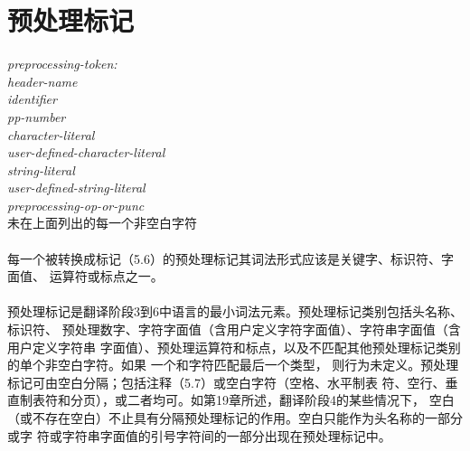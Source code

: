\section{预处理标记}
\noindent \mbox{\qquad \textit{preprocessing-token:}}                         \\
\mbox{\qquad \qquad \textit{header-name}}                                     \\
\mbox{\qquad \qquad \textit{identifier}}                                      \\
\mbox{\qquad \qquad \textit{pp-number}}                                       \\
\mbox{\qquad \qquad \textit{character-literal}}                               \\
\mbox{\qquad \qquad \textit{user-defined-character-literal}}                  \\
\mbox{\qquad \qquad \textit{string-literal}}                                  \\
\mbox{\qquad \qquad \textit{user-defined-string-literal}}                     \\
\mbox{\qquad \qquad \textit{preprocessing-op-or-punc}}                        \\
\mbox{\qquad \qquad 未在上面列出的每一个非空白字符}

\paragraph{}
每一个被转换成标记（5.6）的预处理标记其词法形式应该是关键字、标识符、字面值、
运算符或标点之一。

\paragraph{}
预处理标记是翻译阶段3到6中语言的最小词法元素。预处理标记类别包括头名称、标识符、
预处理数字、字符字面值（含用户定义字符字面值）、字符串字面值（含用户定义字符串
字面值）、预处理运算符和标点，以及不匹配其他预处理标记类别的单个非空白字符。如果
一个\texttt{\qsgl{}}和\texttt{\qdbl{}}字符匹配最后一个类型，
则行为未定义。预处理标记可由空白分隔；包括注释（5.7）或空白字符（空格、水平制表
符、空行、垂直制表符和分页），或二者均可。如第19章所述，翻译阶段4的某些情况下，
空白（或不存在空白）不止具有分隔预处理标记的作用。空白只能作为头名称的一部分或字
符或字符串字面值的引号字符间的一部分出现在预处理标记中。

